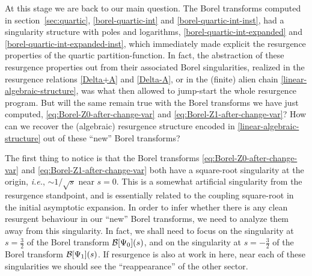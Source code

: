 \documentclass[11pt,a4paper]{article}
\newcommand{\CB}{{\cal B}}
\begin{document}
At this stage we are back to our main question. The Borel transforms computed in section~\ref{sec:quartic}, \eqref{borel-quartic-int} and \eqref{borel-quartic-int-inst}, had a singularity structure with poles and logarithms, \eqref{borel-quartic-int-expanded} and \eqref{borel-quartic-int-expanded-inst}, which immediately made explicit the resurgence properties of the quartic partition-function. In fact, the abstraction of these resurgence properties out from their associated Borel singularities, realized in the resurgence relations \eqref{Delta+A} and \eqref{Delta-A}, or in the (finite) alien chain \eqref{linear-algebraic-structure}, was what then allowed to jump-start the whole resurgence program. But will the same remain true with the Borel transforms we have just computed, \eqref{eq:Borel-Z0-after-change-var} and \eqref{eq:Borel-Z1-after-change-var}? How can we recover the (algebraic) resurgence structure encoded in \eqref{linear-algebraic-structure} out of these ``new'' Borel transforms?

The first thing to notice is that the Borel transforms \eqref{eq:Borel-Z0-after-change-var} and \eqref{eq:Borel-Z1-after-change-var} both have a square-root singularity at the origin, \textit{i.e.}, $\sim 1/\sqrt{s}$ near $s=0$. This is a somewhat artificial singularity from the resurgence standpoint, and is essentially related to the coupling square-root in the initial asymptotic expansion. In order to infer whether there is any clean resurgent behaviour in our ``new'' Borel transforms, we need to analyze them away from this singularity. In fact, we shall need to focus on the singularity at $s=\frac{3}{2}$ of the Borel transform $\CB[\Psi_0](s)$, and on the singularity at $s=-\frac{3}{2}$ of the Borel transform $\CB[\Psi_1](s)$. If resurgence is also at work in here, near each of these singularities we should see the ``reappearance'' of the other sector.
\end{document}
